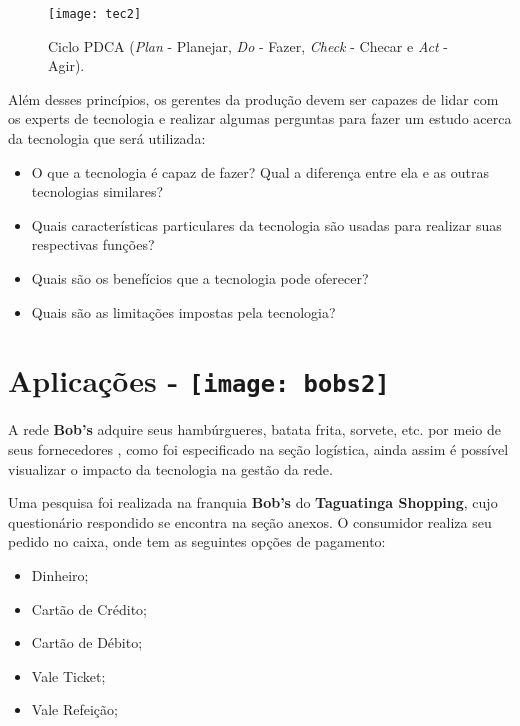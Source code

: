 		\newpage
		\begin{figure}[h]
			\centering
			\texttt{[image: tec2]}
			\caption[Ciclo PDCA (Plan - Planejar, Do - Fazer, Check - Checar e Act - Agir) ]{Ciclo PDCA (\emph{Plan} - Planejar, \emph{Do} - Fazer, \emph{Check} - Checar e \emph{Act} - Agir).}
			\label{fig:tec2}
		\end{figure}

		Além desses princípios, os gerentes da produção devem ser capazes de lidar com os experts de tecnologia e realizar algumas perguntas para fazer um estudo acerca da tecnologia que será utilizada: 

		\begin{itemize}
			\item{O que a tecnologia é capaz de fazer? Qual a diferença entre ela e as outras tecnologias similares?}
			\item{Quais características particulares da tecnologia são usadas para realizar suas respectivas funções?}
			\item{Quais são os benefícios que a tecnologia pode oferecer?}
			\item{Quais são as limitações impostas pela tecnologia?}
		\end{itemize}

	\section[Aplicações]{Aplicações - \texttt{[image: bobs2]}}
	\label{sec:tecnologias_aplicacoes}

		A rede \textbf{Bob’s} adquire seus hambúrgueres, batata frita, sorvete, etc. por meio de seus fornecedores \cite{junior}, como foi especificado na seção logística, ainda assim é possível visualizar o impacto da tecnologia na gestão da rede.
	
		Uma pesquisa foi realizada na franquia \textbf{Bob’s} do \textbf{Taguatinga Shopping}, cujo questionário respondido se encontra na seção anexos. O consumidor realiza seu pedido no caixa, onde tem as seguintes opções de pagamento:

		\begin{itemize}
			\item{Dinheiro};
			\item{Cartão de Crédito};
			\item{Cartão de Débito};
			\item{Vale Ticket};
			\item{Vale Refeição};
		\end{itemize}

